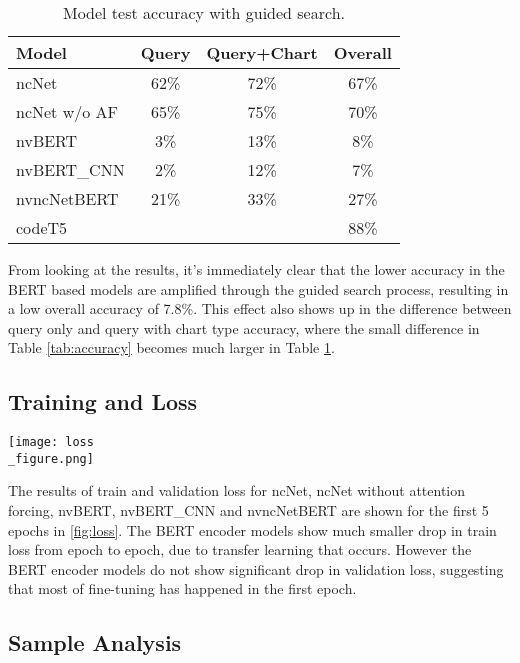 \documentclass[
	a4paper, %
	10pt, %
	unnumberedsections, %
	twoside, %
]{t0003}
\begin{document}
\begin{table} %
	\caption{Model test accuracy with guided search.}
	\centering
	\begin{tabular}{lccc}
		\toprule
		Model & Query & Query+Chart & Overall  \\
		\midrule
		ncNet & 62\% &72\% & 67\% \\
		ncNet w/o AF & 65\% & 75\% & 70\%  \\
		\hline
		nvBERT & 3\% & 13\% & 8\% \\
		nvBERT\_CNN &  2\% & 12\% & 7\% \\
		\hline
		nvncNetBERT & 21\% & 33\% & 27\% \\
		\hline
		codeT5 & & & 88\% \\
		\bottomrule
	\end{tabular}
	\label{tab:guidedaccuracy}
\end{table}

From looking at the results, it's immediately clear that the lower accuracy in the BERT based models are amplified through the guided search process, resulting in a low overall accuracy of 7.8\%. This effect also shows up in the difference between query only and query with chart type accuracy, where the small difference in Table \ref{tab:accuracy} becomes much larger in Table \ref{tab:guidedaccuracy}.

\subsection{Training and Loss}

\begin{figure*}
	\texttt{[image: loss\\\_figure.png]}
	\caption{Train and validation loss of models.}
	\label{fig:loss}
\end{figure*}

The results of train and validation loss for ncNet, ncNet without attention forcing, nvBERT, nvBERT\_CNN and nvncNetBERT are shown for the first 5 epochs in \ref{fig:loss}. The BERT encoder models show much smaller drop in train loss from epoch to epoch, due to transfer learning that occurs. However the BERT encoder models do not show significant drop in validation loss, suggesting that most of fine-tuning has happened in the first epoch.

\subsection{Sample Analysis}
\end{document}

